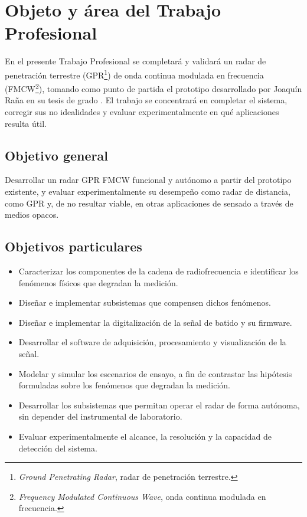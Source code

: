 \documentclass[11pt, a4paper, oneside]{article}
\newcommand{\sigla}[2]{#1\footnote{#2.}}
\begin{document}
\setcounter{page}{2}
{\setlength{\parskip}{0.25em}\tableofcontents}
\markboth{}{}
\clearpage

\section{Objeto y área del Trabajo Profesional}

En el presente Trabajo Profesional se completará y validará un radar de
penetración terrestre (\sigla{GPR}{\textit{Ground Penetrating Radar},
radar de penetración terrestre}) de onda continua modulada en
frecuencia (\sigla{FMCW}{\textit{Frequency Modulated Continuous Wave},
onda continua modulada en frecuencia}), tomando como punto de partida
el prototipo desarrollado por Joaquín Raña en su tesis de grado
\cite{Rana2026}. El trabajo se concentrará en completar el sistema,
corregir sus no idealidades y evaluar experimentalmente en qué
aplicaciones resulta útil.

\subsection{Objetivo general}

Desarrollar un radar GPR FMCW funcional y autónomo a partir del
prototipo existente, y evaluar experimentalmente su desempeño como
radar de distancia, como GPR y, de no resultar viable, en otras
aplicaciones de sensado a través de medios opacos.

\subsection{Objetivos particulares}

\begin{itemize}
  \item Caracterizar los componentes de la cadena de radiofrecuencia e
        identificar los fenómenos físicos que degradan la medición.
  \item Diseñar e implementar subsistemas que compensen dichos
        fenómenos.
  \item Diseñar e implementar la digitalización de la señal de batido y
        su firmware.
  \item Desarrollar el software de adquisición, procesamiento y
        visualización de la señal.
  \item Modelar y simular los escenarios de ensayo, a fin de contrastar
        las hipótesis formuladas sobre los fenómenos que degradan la
        medición.
  \item Desarrollar los subsistemas que permitan operar el radar de
        forma autónoma, sin depender del instrumental de laboratorio.
  \item Evaluar experimentalmente el alcance, la resolución y la
        capacidad de detección del sistema.
\end{itemize}
\end{document}
